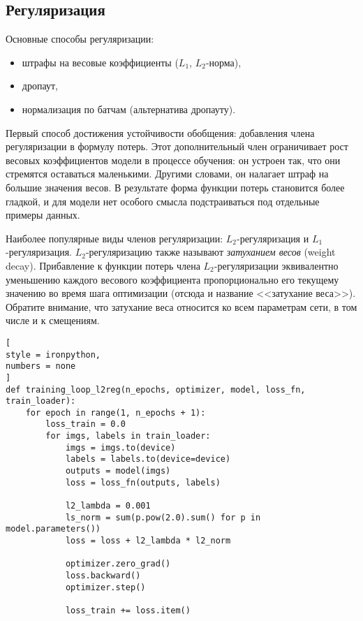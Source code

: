 \documentclass[%
	11pt,
	a4paper,
	utf8,
		]{article}
\begin{document}
\subsection{Регуляризация}

Основные способы регуляризации:
\begin{itemize}
	\item штрафы на весовые коэффициенты ($L_1$, $L_2$-норма),
	
	\item дропаут,
	
	\item нормализация по батчам (альтернатива дропауту).
\end{itemize}

Первый способ достижения устойчивости обобщения: добавления члена регуляризации в формулу потерь. Этот дополнительный член ограничивает рост весовых коэффициентов модели в процессе обучения: он устроен так, что они стремятся оставаться маленькими. Другими словами, он налагает штраф на большие значения весов. В результате форма функции потерь становится более гладкой, и для модели нет особого смысла подстраиваться под отдельные примеры данных.

Наиболее популярные виды членов регуляризации: $L_2$-регуляризация и $L_1$-регуляризация. $L_2$-регуляризацию также называют \emph{затуханием весов} (weight decay). Прибавление к функции потерь члена $L_2$-регуляризации эквивалентно уменьшению каждого весового коэффициента пропорционально его текущему значению во время шага оптимизации (отсюда и название <<затухание веса>>). Обратите внимание, что затухание веса относится ко всем параметрам сети, в том числе и к смещениям.

\begin{lstlisting}[
style = ironpython,
numbers = none
]
def training_loop_l2reg(n_epochs, optimizer, model, loss_fn, train_loader):
    for epoch in range(1, n_epochs + 1):
        loss_train = 0.0
        for imgs, labels in train_loader:
            imgs = imgs.to(device)
            labels = labels.to(device=device)
            outputs = model(imgs)
            loss = loss_fn(outputs, labels)
            
            l2_lambda = 0.001
            ls_norm = sum(p.pow(2.0).sum() for p in model.parameters())
            loss = loss + l2_lambda * l2_norm
            
            optimizer.zero_grad()
            loss.backward()
            optimizer.step()
            
            loss_train += loss.item()
\end{lstlisting}
\end{document}
